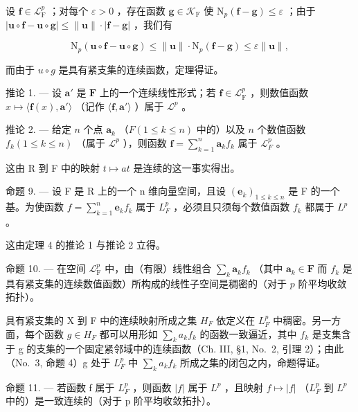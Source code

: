 设 \(\mathbf{f} \in \mathcal{L}_{\mathrm{F}}^{p}\) ；对每个 \(\varepsilon > 0\) ，存在函数 \(\mathbf{g} \in \mathcal{K}_{\mathrm{F}}\) 使 \(\mathrm{N}_p(\mathbf{f} - \mathbf{g}) \leqslant \varepsilon\) ；由于 \(|\mathbf{u} \circ \mathbf{f} - \mathbf{u} \circ \mathbf{g}| \leqslant \| \mathbf{u} \| \cdot |\mathbf{f} - \mathbf{g}|\) ，我们有

\[
\mathrm{N} _ {p} (\mathbf {u} \circ \mathbf {f} - \mathbf {u} \circ \mathbf {g}) \leqslant \| \mathbf {u} \| \cdot \mathrm{N} _ {p} (\mathbf {f} - \mathbf {g}) \leqslant \varepsilon \| \mathbf {u} \|,
\]

而由于 \(u \circ g\) 是具有紧支集的连续函数，定理得证。

推论 1. --- 设 \(\mathbf{a}'\) 是 \(\mathbf{F}\) 上的一个连续线性形式；若 \(\mathbf{f} \in \mathcal{L}_{\mathrm{F}}^{p}\) ，则数值函数 \(x \mapsto \langle \mathbf{f}(x), \mathbf{a}' \rangle\) （记作 \(\langle \mathbf{f}, \mathbf{a}' \rangle\) ）属于 \(\mathcal{L}^p\) 。

推论 2. --- 给定 \(n\) 个点 \(\mathbf{a}_k\) （\(F (1 \leqslant k \leqslant n)\) 中的）以及 \(n\) 个数值函数 \(f_k (1 \leqslant k \leqslant n)\) （属于 \(\mathcal{L}^p\) ），则函数 \(\mathbf{f} = \sum_{k=1}^{n} \mathbf{a}_k f_k\) 属于 \(\mathcal{L}_F^p\) 。

这由 R 到 F 中的映射 \(t \mapsto at\) 是连续的这一事实得出。

命题 9. --- 设 F 是 R 上的一个 n 维向量空间，且设 \((\mathbf{e}_{k})_{1\leqslant k\leqslant n}\) 是 F 的一个基。为使函数 \(f=\sum_{k=1}^{n}\mathbf{e}_{k}f_{k}\) 属于 \(L_{F}^{p}\) ，必须且只须每个数值函数 \(f_{k}\) 都属于 \(L^{p}\) 。

这由定理 4 的推论 1 与推论 2 立得。

命题 10. --- 在空间 \(\mathcal{L}_{\mathrm{F}}^{p}\) 中，由（有限）线性组合 \(\sum_{k} \mathbf{a}_{k} f_{k}\) （其中 \(\mathbf{a}_{k} \in \mathbf{F}\) 而 \(f_{k}\) 是具有紧支集的连续数值函数）所构成的线性子空间是稠密的（对于 \(p\) 阶平均收敛拓扑）。

具有紧支集的 X 到 F 中的连续映射所成之集 \(H_{F}\) 依定义在 \(L_{F}^{p}\) 中稠密。另一方面，每个函数 \(g \in H_{F}\) 都可以用形如 \(\sum_{k} a_{k} f_{k}\) 的函数一致逼近，其中 \(f_{k}\) 是支集含于 g 的支集的一个固定紧邻域中的连续函数（Ch. III, §1, No.~2, 引理 2）；由此（No.~3, 命题 4）g 处于 \(L_{F}^{p}\) 中 \(\sum_{k} a_{k} f_{k}\) 所成之集的闭包之内，命题得证。

命题 11. --- 若函数 f 属于 \(L_{F}^{p}\) ，则函数 \(|f|\) 属于 \(L^{p}\) ，且映射 \(f \mapsto |f|\) （\(L_{F}^{p}\) 到 \(L^{p}\) 中的）是一致连续的（对于 p 阶平均收敛拓扑）。


